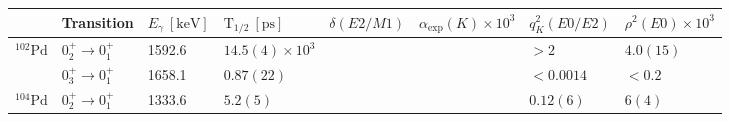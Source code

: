 \begin{sidewaystable}
\begin{center}
\begin{tabular}{|l|l l l l|l l l|} 
\hline
& Transition & $E_\gamma \ [\mathrm{keV}]$ & $\mathrm{T}_{1/2} \  [\mathrm{ps}]$ & $\delta(E2/M1)$ & $\alpha_\mathrm{exp}(K) \times 10^3 $ & $q^2_K(E0/E2)$ & $\rho^2(E0) \times 10^3$\\
\hline
$^{102}\mathrm{Pd}$&$0_2^+\rightarrow 0_1^+$&1592.6 &$14.5(4)\times 10^3$	&&&$>2$        & $4.0(15)$\\
                   &$0_3^+\rightarrow 0_1^+$&1658.1 &$0.87(22)$  			&&&$<0.0014$ & $<0.2$\\
\hline
$^{104}\mathrm{Pd}$&$0_2^+\rightarrow 0_1^+$&1333.6 &$5.2(5)$    			&&&$0.12(6)$	& $6(4)$\\ 
\hline 



\end{tabular}
\end{center}
\end{sidewaystable}
